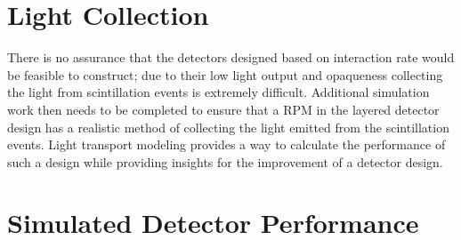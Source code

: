 


\section{Light Collection}
There is no assurance that the detectors designed based on interaction rate would be feasible to construct; due to their low light output and opaqueness collecting the light from scintillation events is extremely difficult.  
Additional simulation work then needs to be completed to ensure that a RPM in the layered detector design has a realistic method of collecting the light emitted from the scintillation events.
Light transport modeling provides a way to calculate the performance of such a design while providing insights for the improvement of a detector design.


\section{Simulated Detector Performance}

